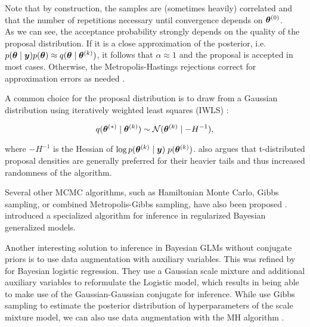 Note that by construction, the samples are (sometimes heavily) correlated and that the number of repetitions necessary until convergence depends on $\bm{\theta}^{(0)}$.\\

As we can see, the acceptance probability strongly depends on the quality of the proposal distribution.
If it is a close approximation of the posterior, i.e. $p(\bm{\theta} \mid \bm{y})p(\bm{\theta}) \approx q(\bm{\theta} \mid \bm{\theta}^{(k)})$, it follows that $\alpha \approx 1$ and the proposal is accepted in most cases.
Otherwise, the Metropolis-Hastings rejections correct for approximation errors as needed \citep{scott_data_2011}.

A common choice for the proposal distribution is to draw from a Gaussian distribution using iteratively weighted least squares (IWLS) :

\begin{equation*}
    q(\bm{\theta}^{(*)} \mid \bm{\theta}^{(k)}) \sim \mathcal{N}(\bm{\theta}^{(k)} \mid -H^{-1}),
\end{equation*}

where $-H^{-1}$ is the Hessian of $\log p(\bm{\theta}^{(k)} \mid \bm{y})\; p(\bm{\theta}^{(k)})$.\footnotemark \;
\citet{scott_data_2011} also argues that t-distributed proposal densities are generally preferred for their heavier tails and thus increased randomness of the algorithm.\\


Several other MCMC algorithms, such as Hamiltonian Monte Carlo, Gibbs sampling, or combined Metropolis-Gibbs sampling, have also been proposed . 
\citet{polson_bayesian_2013} introduced a specialized algorithm for inference in regularized Bayesian generalized models.

Another interesting solution to inference in Bayesian GLMs without conjugate priors is to use data augmentation \citep{albert_bayesian_1993} with auxiliary variables.
This was refined by \citet{holmes_efficient_nodate} for Bayesian logistic regression.
They use a Gaussian scale mixture and additional auxiliary variables to reformulate the Logistic model, which results in being able to make use of the Gaussian-Gaussian conjugate for inference.
While \citet{holmes_efficient_nodate,fruhwirth-schnatter_auxiliary_2007} use Gibbs sampling to estimate the posterior distribution of hyperparameters of the scale mixture model, we can also use data augmentation with the MH algorithm \citep{scott_data_2011}.

